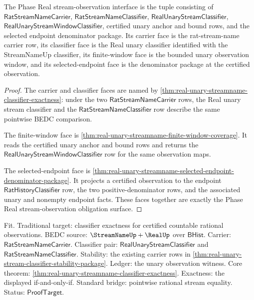 \begin{definition}
\label{def:real-phase-certificate-obligation-surface}
The Phase Real stream-observation interface is the tuple consisting of
$\mathsf{RatStreamNameCarrier}$, $\mathsf{RatStreamNameClassifier}$,
$\mathsf{RealUnaryStreamClassifier}$,
$\mathsf{RealUnaryStreamWindowClassifier}$, certified unary anchor and bound
rows, and the selected endpoint denominator package. Its carrier face is the
rat-stream-name carrier row, its classifier face is the Real unary classifier
identified with the StreamNameUp classifier, its finite-window face is the
bounded unary observation window, and its selected-endpoint face is the
denominator package at the certified observation.
\end{definition}
\begin{proof}
The carrier and classifier faces are named by
\autoref{thm:real-unary-streamname-classifier-exactness}: under the two
$\mathsf{RatStreamNameCarrier}$ rows, the Real unary stream classifier and the
$\mathsf{RatStreamNameClassifier}$ row describe the same pointwise BEDC
comparison.

The finite-window face is
\autoref{thm:real-unary-streamname-finite-window-coverage}. It reads the
certified unary anchor and bound rows and returns the
$\mathsf{RealUnaryStreamWindowClassifier}$ row for the same observation maps.

The selected-endpoint face is
\autoref{thm:real-unary-streamname-selected-endpoint-denominator-package}. It
projects a certified observation to the endpoint
$\mathsf{RatHistoryClassifier}$ row, the two positive-denominator rows, and the
associated unary and nonempty endpoint facts. These faces together are exactly
the Phase Real stream-observation obligation surface.
\end{proof}

Fit. Traditional target: classifier exactness for certified countable rational
observations. BEDC source: $\StreamNameUp+\RealUp$ over $\mathsf{BHist}$.
Carrier: $\mathsf{RatStreamNameCarrier}$. Classifier pair:
$\mathsf{RealUnaryStreamClassifier}$ and
$\mathsf{RatStreamNameClassifier}$. Stability: the existing carrier rows in
\autoref{thm:real-unary-stream-classifier-stability-package}. Ledger: the unary
observation witness. Core theorem:
\autoref{thm:real-unary-streamname-classifier-exactness}. Exactness: the
displayed if-and-only-if. Standard bridge: pointwise rational stream equality.
Status: $\mathsf{ProofTarget}$.

